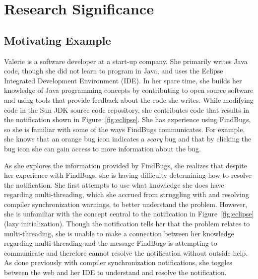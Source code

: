 \documentclass{llncs}
\begin{document}
\section{Research Significance}

\subsection*{Motivating Example}

Valerie is a software developer at a start-up company. She primarily writes Java code, though she did not learn to program in Java, and uses the Eclipse Integrated Development Environment (IDE). In her spare time, she builds her knowledge of Java programming concepts by contributing to open source software and using tools that provide feedback about the code she writes. While modifying code in the Sun JDK source code repository, she contributes code that results in the notification shown in Figure~\ref{fig:eclipse}. She has experience using FindBugs, so she is familiar with some of the ways FindBugs communicates. For example, she knows that an orange bug icon indicates a \textit{scary} bug and that by clicking the bug icon she can gain access to more information about the bug.

As she explores the information provided by FindBugs, she realizes that despite her experience with FindBugs, she is having difficulty determining how to resolve the notification. She first attempts to use what knowledge she does have regarding multi-threading, which she accrued from struggling with and resolving compiler synchronization warnings, to better understand the problem. 
However, she is unfamiliar with the concept central to the notification in Figure~\ref{fig:eclipse} (lazy initialization). Though the notification tells her that the problem relates to multi-threading, she is unable to make a connection between her knowledge regarding multi-threading and the message FindBugs is attempting to communicate and therefore cannot resolve the notification without outside help. As done previously with compiler synchronization notifications, she toggles between the web and her IDE to understand and resolve the notification.

\end{document}
